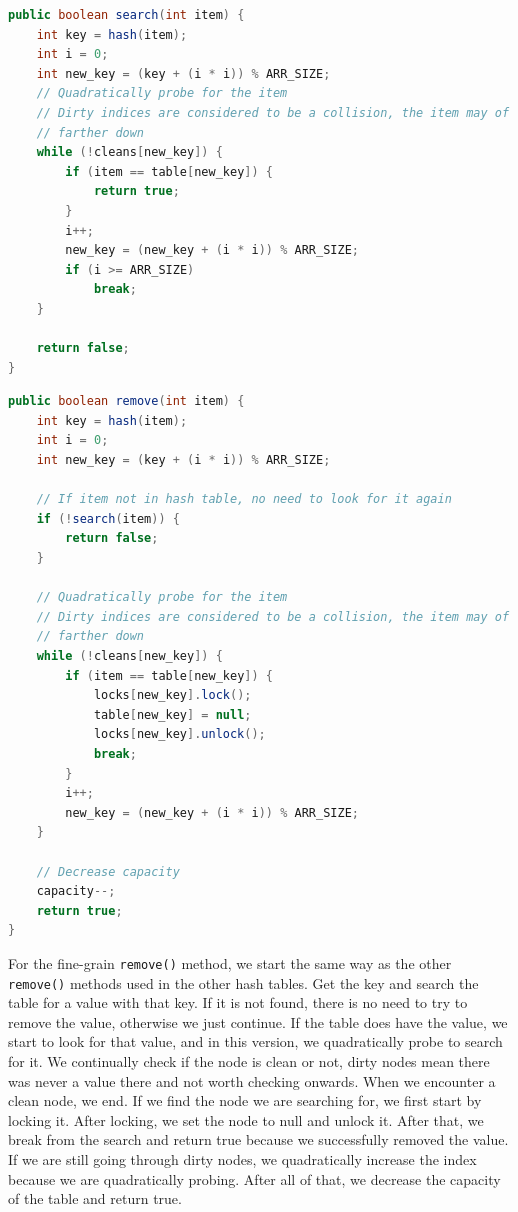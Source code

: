 \documentclass[conference]{IEEEtran}
\begin{document}
\begin{lstlisting}[language={Java},caption=Source code for the fine-grain search() method.,captionpos=b,breaklines=true,frame=single]
public boolean search(int item) {
    int key = hash(item);
    int i = 0;
    int new_key = (key + (i * i)) % ARR_SIZE;
    // Quadratically probe for the item
    // Dirty indices are considered to be a collision, the item may of been probed
    // farther down
    while (!cleans[new_key]) {
        if (item == table[new_key]) {
            return true;
        }
        i++;
        new_key = (new_key + (i * i)) % ARR_SIZE;
        if (i >= ARR_SIZE)
            break;
    }

    return false;
}
\end{lstlisting}

\begin{lstlisting}[language={Java},caption=Source code for the fine-grain remove() method.,captionpos=b,breaklines=true,frame=single]
public boolean remove(int item) {
    int key = hash(item);
    int i = 0;
    int new_key = (key + (i * i)) % ARR_SIZE;

    // If item not in hash table, no need to look for it again
    if (!search(item)) {
        return false;
    }

    // Quadratically probe for the item
    // Dirty indices are considered to be a collision, the item may of been probed
    // farther down
    while (!cleans[new_key]) {
        if (item == table[new_key]) {
            locks[new_key].lock();
            table[new_key] = null;
            locks[new_key].unlock();
            break;
        }
        i++;
        new_key = (new_key + (i * i)) % ARR_SIZE;
    }

    // Decrease capacity
    capacity--;
    return true;
}
\end{lstlisting}
For the fine-grain \verb|remove()| method, we start the same way as the other \verb|remove()| methods used in the other hash tables.
Get the key and search the table for a value with that key. If it is not found, there is no need to try to remove the value, otherwise we just continue.
If the table does have the value, we start to look for that value, and in this version, we quadratically probe to search for it. We continually check if the node is clean or not, dirty nodes mean there was never a value there and not worth checking onwards.
When we encounter a clean node, we end. If we find the node we are searching for, we first start by locking it. After locking, we set the node to null and unlock it. After that, we break from the search and return true because we successfully removed the value.
If we are still going through dirty nodes, we quadratically increase the index because we are quadratically probing. After all of that, we decrease the capacity of the table and return true.
\end{document}
